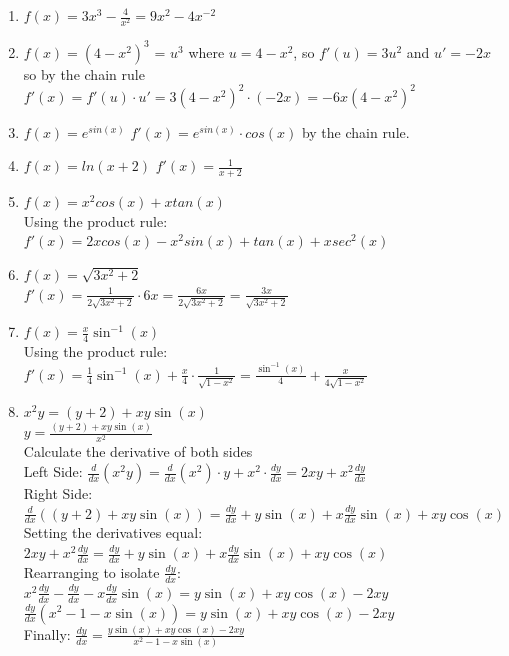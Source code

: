 \documentclass{article}
\begin{document}
\begin{enumerate}
    \item $f(x) = 3x^3 - \frac{4}{x^2} = 9x^2 - 4x^{-2}$
    \item $f(x) = (4 - x^2)^3$ = $u^3$ where $u = 4 - x^2$, so $f'(u) = 3u^2$ and $u' = -2x$ so by the chain rule $f'(x) = f'(u) \cdot u' = 3(4 - x^2)^2 \cdot (-2x) = -6x(4 - x^2)^2$
    \item $f(x) = e^{sin(x)}$
    $f'(x) = e^{sin(x)} \cdot cos(x)$ by the chain rule.
    \item $f(x) = ln(x+2)$
    $f'(x) = \frac{1}{x+2}$
    \item $f(x) = x^2cos(x) + xtan(x)$ \\
    Using the product rule:
    $f'(x) = 2xcos(x) - x^2sin(x) + tan(x) + xsec^2(x)$
    \item $f(x) = \sqrt{3x^2+2}$ \\
    $f'(x) = \frac{1}{2\sqrt{3x^2+2}} \cdot 6x = \frac{6x}{2\sqrt{3x^2+2}} = \frac{3x}{\sqrt{3x^2+2}}$
    \item $f(x) = \frac{x}{4}\sin^{-1}(x)$ \\
    Using the product rule:
    $f'(x) = \frac{1}{4}\sin^{-1}(x) + \frac{x}{4} \cdot \frac{1}{\sqrt{1 - x^2}} = \frac{\sin^{-1}(x)}{4} + \frac{x}{4\sqrt{1 - x^2}}$

    \item $x^2y = (y+2) + xy\sin(x)$ \\
    $y = \frac{(y+2) + xy\sin(x)}{x^2}$ \\
    Calculate the derivative of both sides \\
    Left Side: $\frac{d}{dx}(x^2y) = \frac{d}{dx}(x^2) \cdot y + x^2 \cdot \frac{dy}{dx} = 2xy + x^2 \frac{dy}{dx}$ \\
    Right Side: $\frac{d}{dx}((y+2) + xy\sin(x)) = \frac{dy}{dx} + y\sin(x) + x\frac{dy}{dx}\sin(x) + xy\cos(x)$ \\
    Setting the derivatives equal:
    $2xy + x^2 \frac{dy}{dx} = \frac{dy}{dx} + y\sin(x) + x\frac{dy}{dx}\sin(x) + xy\cos(x)$ \\
    Rearranging to isolate $\frac{dy}{dx}$:
    $x^2 \frac{dy}{dx} - \frac{dy}{dx} - x\frac{dy}{dx}\sin(x) = y\sin(x) + xy\cos(x) - 2xy$ \\
    $\frac{dy}{dx}(x^2 - 1 - x\sin(x)) = y\sin(x) + xy\cos(x) - 2xy$ \\
    Finally:
    $\frac{dy}{dx} = \frac{y\sin(x) + xy\cos(x) - 2xy}{x^2 - 1 - x\sin(x)}$
\end{enumerate}
\end{document}
